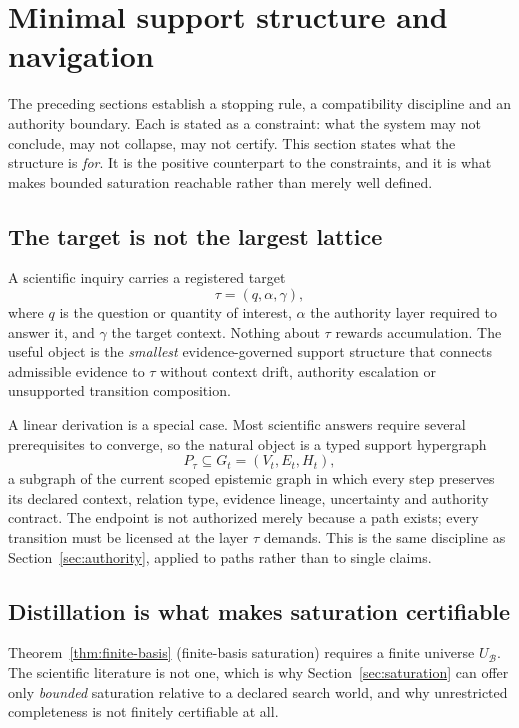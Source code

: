 \section{Minimal support structure and navigation}\label{sec:support-structure}

The preceding sections establish a stopping rule, a compatibility discipline and an authority boundary. Each is stated as a constraint: what the system may not conclude, may not collapse, may not certify. This section states what the structure is \emph{for}. It is the positive counterpart to the constraints, and it is what makes bounded saturation reachable rather than merely well defined.

\subsection{The target is not the largest lattice}

A scientific inquiry carries a registered target
\[
\tau=(q,\alpha,\gamma),
\]
where \(q\) is the question or quantity of interest, \(\alpha\) the authority layer required to answer it, and \(\gamma\) the target context. Nothing about \(\tau\) rewards accumulation. The useful object is the \emph{smallest} evidence-governed support structure that connects admissible evidence to \(\tau\) without context drift, authority escalation or unsupported transition composition.

A linear derivation is a special case. Most scientific answers require several prerequisites to converge, so the natural object is a typed support hypergraph
\[
P_\tau\subseteq G_t=(V_t,E_t,H_t),
\]
a subgraph of the current scoped epistemic graph in which every step preserves its declared context, relation type, evidence lineage, uncertainty and authority contract. The endpoint is not authorized merely because a path exists; every transition must be licensed at the layer \(\tau\) demands. This is the same discipline as Section~\ref{sec:authority}, applied to paths rather than to single claims.

\subsection{Distillation is what makes saturation certifiable}

Theorem~\ref{thm:finite-basis} (finite-basis saturation) requires a finite universe \(U_{\mathcal B}\). The scientific literature is not one, which is why Section~\ref{sec:saturation} can offer only \emph{bounded} saturation relative to a declared search world, and why unrestricted completeness is not finitely certifiable at all.

